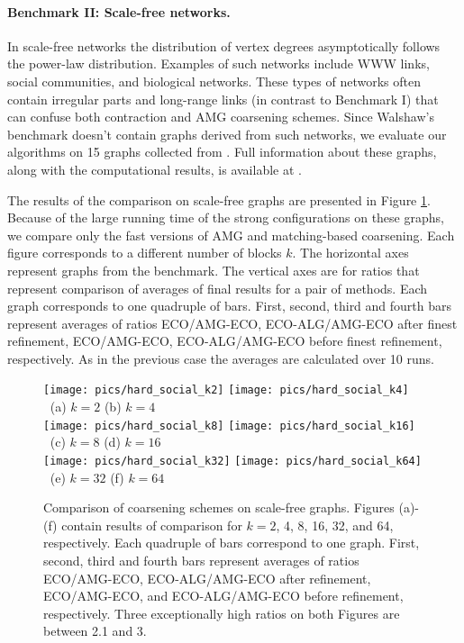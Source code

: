 \documentclass{llncs}
\begin{document}
\paragraph{Benchmark II: Scale-free networks.} In scale-free networks the distribution of vertex degrees asymptotically follows the power-law distribution. Examples of such networks include WWW links, social communities, and biological networks. 
These types of networks often contain irregular parts and long-range links (in contrast to Benchmark I) that can confuse both contraction and AMG coarsening schemes. 
Since Walshaw's benchmark doesn't contain graphs derived from such networks, we evaluate our algorithms on 15 graphs collected from \cite{dimacs10,snap}. Full information about these graphs, along with the computational results, is available at \cite{hardpart-site}.
\par The results of the comparison on scale-free graphs are presented in Figure \ref{fig:scalefree}. 
Because of the large running time of the strong configurations on these graphs, we compare only the fast versions of AMG and matching-based coarsening. 
Each figure corresponds to a different number of blocks $k$. The horizontal axes represent graphs from the benchmark. The vertical axes are for ratios that represent comparison of averages of final results for a pair of methods. Each graph corresponds to one quadruple of bars. First, second, third and fourth bars represent averages of ratios ECO/AMG-ECO, ECO-ALG/AMG-ECO after finest refinement, ECO/AMG-ECO, ECO-ALG/AMG-ECO before finest refinement, respectively. As in the previous case the averages are calculated over 10 runs.
\begin{figure}
\texttt{[image: pics/hard\_social\_k2]}  \hspace{-1cm}
\texttt{[image: pics/hard\_social\_k4]}\\
$~$ \hspace{4cm} (a) $k=2$ \hspace{6cm} (b) $k=4$ \\
\texttt{[image: pics/hard\_social\_k8]}  \hspace{-1cm}
\texttt{[image: pics/hard\_social\_k16]}\\
$~$ \hspace{4cm} (c) $k=8$ \hspace{6cm} (d) $k=16$ \\
\texttt{[image: pics/hard\_social\_k32]}  \hspace{-1cm}
\texttt{[image: pics/hard\_social\_k64]}\\
$~$ \hspace{4cm} (e) $k=32$ \hspace{6cm} (f) $k=64$ \\
\caption{Comparison of coarsening schemes on scale-free graphs. Figures (a)-(f) contain results of comparison for $k=2$, 4, 8, 16, 32, and 64, respectively. Each quadruple of bars correspond to one graph. First, second, third and fourth bars represent averages of ratios ECO/AMG-ECO, ECO-ALG/AMG-ECO after refinement, ECO/AMG-ECO, and ECO-ALG/AMG-ECO before refinement, respectively. Three exceptionally high ratios on both Figures are between 2.1 and 3.}\label{fig:scalefree} 
\end{figure}
\end{document}
